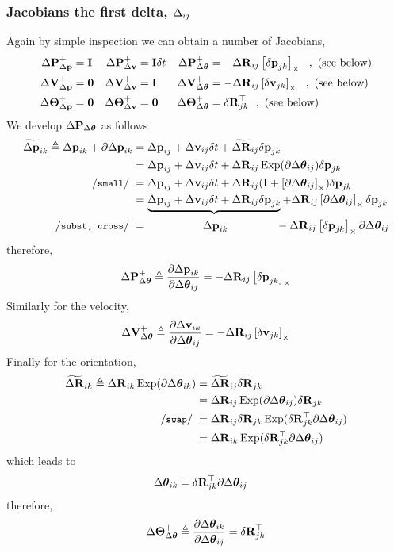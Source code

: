 \subsubsection{Jacobians \wrt the first delta, $\Delta_{ij}$}
\label{sec:jac_first_delta}

Again by simple inspection we can obtain a number of Jacobians,
%
\begin{align*}
\DP^+_\Dp &= \bfI  & \DP^+_\Dv &= \bfI\dt & \DP^+_\Dth &= - \DR_{ij}  \hatx{\dpp_{jk}}  ~~,\textrm{ (see below)}\\%
\DV^+_\Dp &= \bf0  & \DV^+_\Dv &= \bfI & \DV^+_\Dth &= - \DR_{ij}  \hatx{\dv_{jk}}  ~~,\textrm{ (see below)}\\%
\DTH^+_\Dp &= \bf0  & \DTH^+_\Dv &= \bf0 & \DTH^+_\Dth &= \dR_{jk}\tr %
~~,\textrm{ (see below)}
\end{align*}
%
We develop ${\Delta{\bf P}}_{\Delta{{\bm \theta}}}$ as follows
%
\begin{align*}
\widetilde\Dp_{ik} \te \Dp_{ik}+\partial\Dp_{ik} 
&= \Dp_{ij} + \Dv_{ij}\dt + \widetilde\DR_{ij}\dpp_{jk} \\
&= \Dp_{ij} + \Dv_{ij}\dt + \DR_{ij}\Exp(\partial\Dth_{ij})\dpp_{jk} \\
\csmall
&= \Dp_{ij} + \Dv_{ij}\dt + \DR_{ij}(\bfI+\hatx{\partial\Dth_{ij}})\dpp_{jk} \\
&= \underbrace{\Dp_{ij} + \Dv_{ij}\dt + \DR_{ij}\dpp_{jk}} + \DR_{ij}\hatx{\partial\Dth_{ij}}\dpp_{jk} \\
\com{subst, cross}
&= ~~~~~~~~~~~~~~~\Dp_{ik} ~~~~~~~~~~~~~  - \DR_{ij}\hatx{\dpp_{jk}}\partial\Dth_{ij} 
\end{align*}
%
therefore,
%
\begin{align}
{\Delta{\bf P}}^+_{\Delta{{\bm \theta}}} \triangleq \frac{\partial{\Delta{\bf p}}_{ik}}{\partial{\Delta{{\bm \theta}}}_{ij}} = - {\Delta{\bf R}}_{ij}\left[{\delta{\bf p}}_{jk}\right]_\times
\end{align}
%
Similarly for the velocity,
%
\begin{align}
{\Delta{\bf V}}^+_{\Delta{{\bm \theta}}} \triangleq \frac{\partial{\Delta{\bf v}}_{ik}}{\partial{\Delta{{\bm \theta}}}_{ij}} = - {\Delta{\bf R}}_{ij}\left[{\delta{\bf v}}_{jk}\right]_\times
\end{align}
%
Finally for the orientation,
%
\begin{align*}
\widetilde\DR_{ik} \te \DR_{ik}\Exp(\partial\Dth_{ik}) 
&= \widetilde\DR_{ij}\dR_{jk} \\
&= \DR_{ij}\Exp(\partial\Dth_{ij})\dR_{jk}  \\
\cswap
&= \DR_{ij}\dR_{jk}\Exp(\dR_{jk}\tr\partial\Dth_{ij})  \\
&= \DR_{ik}\Exp(\dR_{jk}\tr\partial\Dth_{ij})  
\end{align*}
%
which leads to
%
\begin{align*}
{\Delta{{\bm \theta}}}_{ik} &= {\delta{\bf R}}_{jk}^{\top}\partial{\Delta{{\bm \theta}}}_{ij}
\end{align*}
%
therefore,
%
\begin{align}
{\Delta{\bm \Theta}}^+_{\Delta{{\bm \theta}}} \triangleq \frac{\partial{\Delta{{\bm \theta}}}_{ik}}{\partial{\Delta{{\bm \theta}}}_{ij}} = {\delta{\bf R}}_{jk}^{\top}
\end{align}




